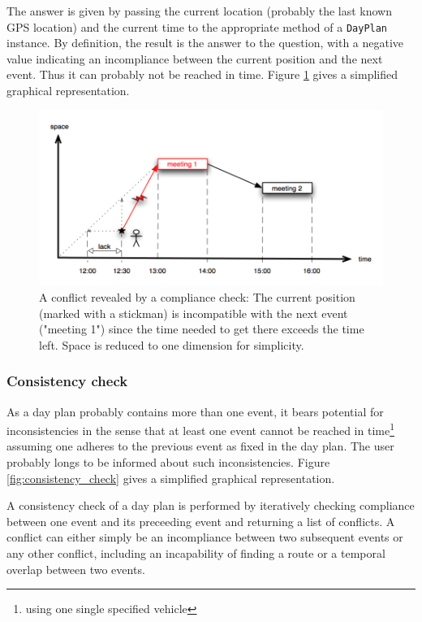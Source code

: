 The answer is given by passing the current location (probably the last known GPS location) and the current time to the appropriate method of a \texttt{DayPlan} instance. By definition, the result is the answer to the question, with a negative value indicating an incompliance between the current position and the next event. Thus it can probably not be reached in time. Figure \ref{fig:compliance_check} gives a simplified graphical representation.

\begin{figure}[h!]
	\centering
	\includegraphics[width=15cm]{pics/compliance_check_lack.png}
	\caption{A conflict revealed by a compliance check: The current position (marked with a stickman) is incompatible with the next event ("meeting 1") since the time needed to get there exceeds the time left. Space is reduced to one dimension for simplicity.}
	\label{fig:compliance_check}
\end{figure}

\subsubsection{Consistency check}

As a day plan probably contains more than one event, it bears potential for inconsistencies in the sense that at least one event cannot be reached in time\footnote{using one single specified vehicle} assuming one adheres to the previous event as fixed in the day plan. The user probably longs to be informed about such inconsistencies. Figure \ref{fig:consistency_check} gives a simplified graphical representation.\newline

A consistency check of a day plan is performed by iteratively checking compliance between one event and its preceeding event and returning a list of conflicts. A conflict can either simply be an incompliance between two subsequent events or any other conflict, including an incapability of finding a route or a temporal overlap between two events.

